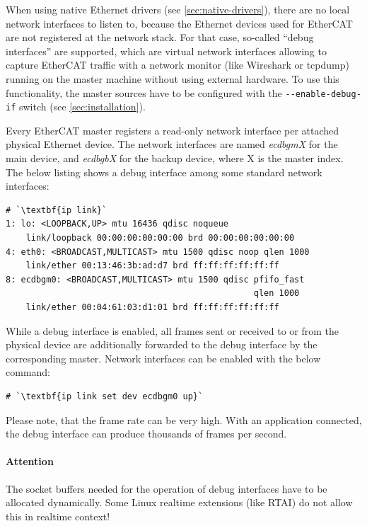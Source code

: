 \documentclass[a4paper,12pt,BCOR6mm,bibtotoc,idxtotoc]{scrbook}
\begin{document}
When using native Ethernet drivers (see \autoref{sec:native-drivers}), there
are no local network interfaces to listen to, because the Ethernet devices
used for EtherCAT are not registered at the network stack. For that case,
so-called ``debug interfaces'' are supported, which are virtual network
interfaces allowing to capture EtherCAT traffic with a network monitor (like
Wireshark or tcpdump) running on the master machine without using external
hardware. To use this functionality, the master sources have to be configured
with the \lstinline+--enable-debug-if+ switch (see
\autoref{sec:installation}).

Every EtherCAT master registers a read-only network interface per attached
physical Ethernet device. The network interfaces are named \textit{ecdbgmX}
for the main device, and \textit{ecdbgbX} for the backup device, where X is
the master index. The below listing shows a debug interface among some
standard network interfaces:

\begin{lstlisting}
# `\textbf{ip link}`
1: lo: <LOOPBACK,UP> mtu 16436 qdisc noqueue
    link/loopback 00:00:00:00:00:00 brd 00:00:00:00:00:00
4: eth0: <BROADCAST,MULTICAST> mtu 1500 qdisc noop qlen 1000
    link/ether 00:13:46:3b:ad:d7 brd ff:ff:ff:ff:ff:ff
8: ecdbgm0: <BROADCAST,MULTICAST> mtu 1500 qdisc pfifo_fast
                                                 qlen 1000
    link/ether 00:04:61:03:d1:01 brd ff:ff:ff:ff:ff:ff
\end{lstlisting}

While a debug interface is enabled, all frames sent or received to or from the
physical device are additionally forwarded to the debug interface by the
corresponding master. Network interfaces can be enabled with the below
command:

\begin{lstlisting}
# `\textbf{ip link set dev ecdbgm0 up}`
\end{lstlisting}

Please note, that the frame rate can be very high. With an application
connected, the debug interface can produce thousands of frames per second.

\paragraph{Attention} The socket buffers needed for the operation of debug
interfaces have to be allocated dynamically. Some Linux realtime extensions
(like RTAI) do not allow this in realtime context!
\end{document}
